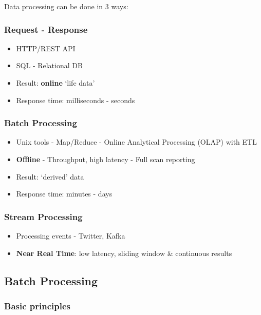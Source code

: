 \documentclass{article}
\begin{document}
Data processing can be done in 3 ways:

\subsubsection{Request - Response}

\begin{itemize}
    \item HTTP/REST API
    \item SQL - Relational DB
    \item Result: \textbf{online} `life data'
    \item Response time: milliseconds - seconds
\end{itemize}

\subsubsection{Batch Processing}

\begin{itemize}
    \item Unix tools - Map/Reduce - Online Analytical Processing (OLAP) with ETL
    \item \textbf{Offline} - Throughput, high latency - Full scan reporting
    \item Result: `derived' data
    \item Response time: minutes - days
\end{itemize}

\subsubsection{Stream Processing}

\begin{itemize}
    \item Processing events - Twitter, Kafka
    \item \textbf{Near Real Time}: low latency, sliding window \& continuous results
\end{itemize}

\subsection{Batch Processing}

\subsubsection{Basic principles}
\end{document}
